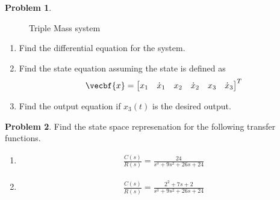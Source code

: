 \documentclass[10pt]{article}
\theoremstyle{definition}
\newtheorem{prob}{Problem}[section]
\newenvironment{subprob}%
{\renewcommand{\theenumi}{\alph{enumi}}\renewcommand{\labelenumi}{(\theenumi)}\begin{enumerate}}%
{\end{enumerate}}%
\begin{document}
\begin{prob}
\begin{figure}[h]
    \caption{Triple Mass system~\label{fig:triple_mass}}
    \end{figure}

    \begin{subprob}
        \item Find the differential equation for the system.
        \item Find the state equation assuming the state is defined as
            \begin{align*}
                \vecbf{x} = \begin{bmatrix} x_1 & \dot{x}_1 & x_2 & \dot{x}_2 & x_3 & \dot{x}_3\end{bmatrix}^T
            \end{align*}

        \item Find the output equation if \( x_3(t)\) is the desired output.
    \end{subprob}
\end{prob}

\begin{prob}
   Find the  state space represenation for the following transfer functions.
   \begin{subprob}
        \item  
            \begin{align*}
                \frac{C(s)}{R(s)} = \frac{24}{s^3 + 9s^2 + 26s + 24}
            \end{align*}
        \item 
            \begin{align*}
                \frac{C(s)}{R(s)} = \frac{2^2 + 7s + 2}{s^3 + 9s^2 + 26s + 24}
            \end{align*}
   \end{subprob}
\end{prob}
\end{document}
